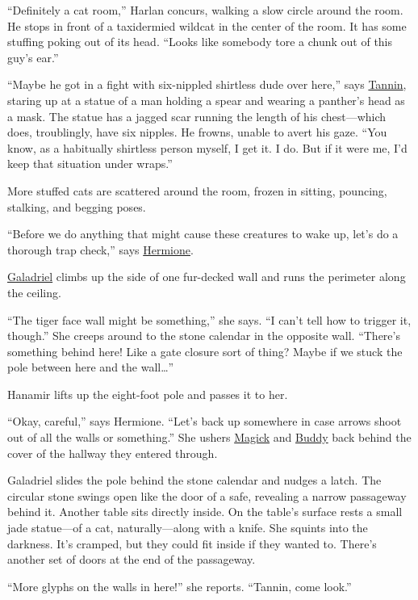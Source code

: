 \documentclass[smalldemyvopaper,11pt,twoside,onecolumn,openright,extrafontsizes]{memoir}
\begin{document}
``Definitely a cat room,'' Harlan concurs, walking a slow circle around
the room. He stops in front of a taxidermied wildcat in the center of
the room. It has some stuffing poking out of its head. ``Looks like
somebody tore a chunk out of this guy's ear.''

``Maybe he got in a fight with six-nippled shirtless dude over here,''
says \href{/characters/tannin/}{Tannin}, staring up at a statue of a man
holding a spear and wearing a panther's head as a mask. The statue has a
jagged scar running the length of his chest---which does, troublingly,
have six nipples. He frowns, unable to avert his gaze. ``You know, as a
habitually shirtless person myself, I get it. I do. But if it were me,
I'd keep that situation under wraps.''

More stuffed cats are scattered around the room, frozen in sitting,
pouncing, stalking, and begging poses.

``Before we do anything that might cause these creatures to wake up,
let's do a thorough trap check,'' says
\href{/characters/hermione/}{Hermione}.

\href{/characters/galadriel/}{Galadriel} climbs up the side of one
fur-decked wall and runs the perimeter along the ceiling.

``The tiger face wall might be something,'' she says. ``I can't tell how
to trigger it, though.'' She creeps around to the stone calendar in the
opposite wall. ``There's something behind here! Like a gate closure sort
of thing? Maybe if we stuck the pole between here and the wall\ldots{}''

Hanamir lifts up the eight-foot pole and passes it to her.

``Okay, careful,'' says Hermione. ``Let's back up somewhere in case
arrows shoot out of all the walls or something.'' She ushers
\href{/characters/magick/}{Magick} and \href{/characters/buddy/}{Buddy}
back behind the cover of the hallway they entered through.

Galadriel slides the pole behind the stone calendar and nudges a latch.
The circular stone swings open like the door of a safe, revealing a
narrow passageway behind it. Another table sits directly inside. On the
table's surface rests a small jade statue---of a cat, naturally---along
with a knife. She squints into the darkness. It's cramped, but they
could fit inside if they wanted to. There's another set of doors at the
end of the passageway.

``More glyphs on the walls in here!'' she reports. ``Tannin, come
look.''
\end{document}
